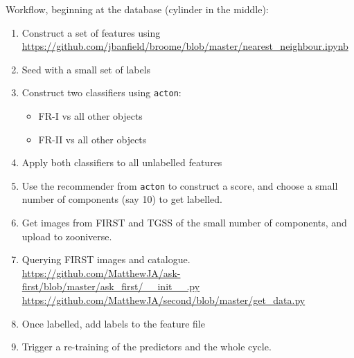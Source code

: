 \documentclass{article}
\begin{document}
Workflow, beginning at the database (cylinder in the middle):
\begin{enumerate}
  \item Construct a set of features using\\ \url{https://github.com/jbanfield/broome/blob/master/nearest_neighbour.ipynb}
  \item Seed with a small set of labels
  \item Construct two classifiers using \texttt{acton}:
    \begin{itemize}
      \item FR-I vs all other objects
      \item FR-II vs all other objects
    \end{itemize}
  \item Apply both classifiers to all unlabelled features
  \item Use the recommender from \texttt{acton} to construct a score,
    and choose a small number of components (say 10) to get labelled.
  \item Get images from FIRST and TGSS of the small number of components,
    and upload to zooniverse.
  \item Querying FIRST images and catalogue.\\ \url{https://github.com/MatthewJA/ask-first/blob/master/ask_first/__init__.py}\\
  \url{https://github.com/MatthewJA/second/blob/master/get_data.py}
  \item Once labelled, add labels to the feature file
  \item Trigger a re-training of the predictors and the whole cycle.
\end{enumerate}
\end{document}
